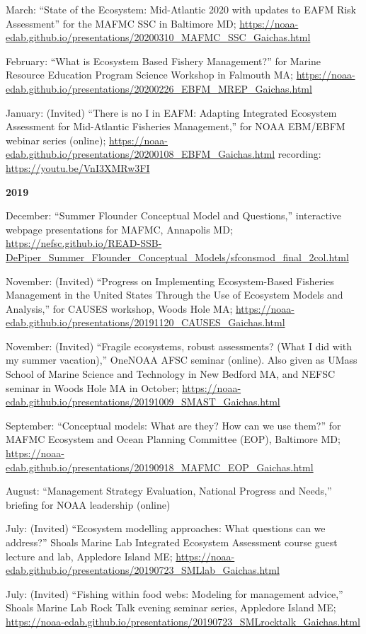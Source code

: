 \documentclass[11pt, a4paper]{awesome-cv}
\begin{document}
March: ``State of the Ecosystem: Mid-Atlantic 2020 with updates to EAFM
Risk Assessment'' for the MAFMC SSC in Baltimore MD;
\url{https://noaa-edab.github.io/presentations/20200310_MAFMC_SSC_Gaichas.html}

February: ``What is Ecosystem Based Fishery Management?'' for Marine
Resource Education Program Science Workshop in Falmouth MA;
\url{https://noaa-edab.github.io/presentations/20200226_EBFM_MREP_Gaichas.html}

January: (Invited) ``There is no I in EAFM: Adapting Integrated
Ecosystem Assessment for Mid-Atlantic Fisheries Management,'' for NOAA
EBM/EBFM webinar series (online);
\url{https://noaa-edab.github.io/presentations/20200108_EBFM_Gaichas.html}
recording: \url{https://youtu.be/VnI3XMRw3FI}

\textbf{2019}

December: ``Summer Flounder Conceptual Model and Questions,''
interactive webpage presentations for MAFMC, Annapolis MD;
\url{https://nefsc.github.io/READ-SSB-DePiper_Summer_Flounder_Conceptual_Models/sfconsmod_final_2col.html}

November: (Invited) ``Progress on Implementing Ecosystem-Based Fisheries
Management in the United States Through the Use of Ecosystem Models and
Analysis,'' for CAUSES workshop, Woods Hole MA;
\url{https://noaa-edab.github.io/presentations/20191120_CAUSES_Gaichas.html}

November: (Invited) ``Fragile ecosystems, robust assessments? (What I
did with my summer vacation),'' OneNOAA AFSC seminar (online). Also
given as UMass School of Marine Science and Technology in New Bedford
MA, and NEFSC seminar in Woods Hole MA in October;
\url{https://noaa-edab.github.io/presentations/20191009_SMAST_Gaichas.html}

September: ``Conceptual models: What are they? How can we use them?''
for MAFMC Ecosystem and Ocean Planning Committee (EOP), Baltimore MD;
\url{https://noaa-edab.github.io/presentations/20190918_MAFMC_EOP_Gaichas.html}

August: ``Management Strategy Evaluation, National Progress and Needs,''
briefing for NOAA leadership (online)

July: (Invited) ``Ecosystem modelling approaches: What questions can we
address?'' Shoals Marine Lab Integrated Ecosystem Assessment course
guest lecture and lab, Appledore Island ME;
\url{https://noaa-edab.github.io/presentations/20190723_SMLlab_Gaichas.html}

July: (Invited) ``Fishing within food webs: Modeling for management
advice,'' Shoals Marine Lab Rock Talk evening seminar series, Appledore
Island ME;
\url{https://noaa-edab.github.io/presentations/20190723_SMLrocktalk_Gaichas.html}
\end{document}
